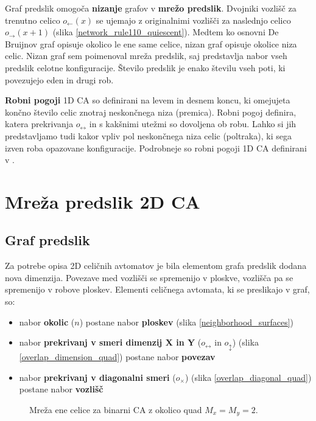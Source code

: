 \documentclass[12pt,a4paper,openany,twoside]{book}
\begin{document}
Graf predslik omogoča \textbf{nizanje} grafov v \textbf{mrežo predslik}.
Dvojniki vozlišč za trenutno celico \(o_{\leftarrow}(x)\) se ujemajo z
originalnimi vozlišči za naslednjo celico \(o_{\rightarrow}(x+1)\) (slika \ref{network_rule110_quiescent}).
Medtem ko osnovni De Bruijnov graf opisuje okolico le ene same celice,
nizan graf opisuje okolice niza celic.
Nizan graf sem poimenoval mreža predslik,
saj predstavlja nabor vseh predslik celotne konfiguracije.
Število predslik je enako številu vseh poti,
ki povezujejo eden in drugi rob.

\textbf{Robni pogoji} 1D CA so definirani na levem in desnem koncu,
ki omejujeta končno število celic znotraj neskončnega niza (premica).
Robni pogoj definira, katera prekrivanja \(o_{\leftrightarrow}\)
in s kakšnimi utežmi so dovoljena ob robu.
Lahko si jih predstavljamo tudi kakor vpliv pol neskončnega niza celic (poltraka),
ki sega izven roba opazovane konfiguracije.
Podrobneje so robni pogoji 1D CA definirani v \cite{JerasDobnikar2007}.

\section{Mreža predslik 2D CA}

\subsection{Graf predslik}

Za potrebe opisa 2D celičnih avtomatov je bila elementom
grafa predslik dodana nova dimenzija. Povezave med vozlišči se spremenijo
v ploskve, vozlišča pa se spremenijo v robove ploskev.
Elementi celičnega avtomata, ki se preslikajo v graf, so:
\begin{itemize}[noitemsep,nolistsep]
\item nabor \textbf{okolic} (\(n\)) postane nabor \textbf{ploskev} (slika \ref{neighborhood_surfaces})
\item nabor \textbf{prekrivanj v smeri dimenzij X in Y} (\(o_{\leftrightarrow}\) in \(o_{\updownarrow}\)) (slika \ref{overlap_dimension_quad}) postane nabor \textbf{povezav}
\item nabor \textbf{prekrivanj v diagonalni smeri} (\(o_{\times}\)) (slika \ref{overlap_diagonal_quad}) postane nabor \textbf{vozlišč}
\end{itemize}

\begin{figure}[htb]
\centerline{}
\caption[Mreža ene celice.]{Mreža ene celice za binarni CA z okolico quad \(M_x=M_y=2\).}
\label{network_single}
\end{figure}
\end{document}
